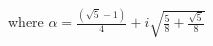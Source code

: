 \documentclass[preview]{standalone}
\begin{document}
\begin{center}
where $\alpha = \frac {(\sqrt{5} - 1)} 4 + i \sqrt{\frac 58 + \frac{\sqrt 5}{8}}$
\end{center}
\end{document}
